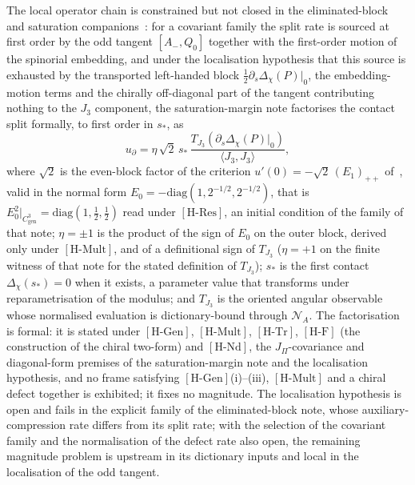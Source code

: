 \documentclass[11pt,a4paper]{article}
\theoremstyle{definition}
\newcommand{\Cgen}{C^3_{\mathrm{gen}}}
\newcommand{\HRes}{\ensuremath{[\mathrm{H\text{-}Res}]}}
\newcommand{\HGen}{\ensuremath{[\mathrm{H\text{-}Gen}]}}
\newcommand{\HMult}{\ensuremath{[\mathrm{H\text{-}Mult}]}}
\newcommand{\HTr}{\ensuremath{[\mathrm{H\text{-}Tr}]}}
\newcommand{\HNd}{\ensuremath{[\mathrm{H\text{-}Nd}]}}
\newcommand{\HF}{\ensuremath{[\mathrm{H\text{-}F}]}}
\begin{document}
    The local operator chain is constrained but not closed in the eliminated-block and saturation
    companions~\cite{Beau2026ebj, Beau2026bim}: for a covariant family the split rate is sourced at first order by the
    odd tangent $[A_-,Q_0]$ together with the first-order motion of the spinorial embedding, and under the localisation
    hypothesis that this source is exhausted by the transported left-handed block $\tfrac12\partial_s\Delta_\chi(P)|_0$,
    the embedding-motion terms and the chirally off-diagonal part of the tangent contributing nothing to the $J_3$
    component, the saturation-margin note factorises the contact split formally, to first order in $s_*$, as
    \[
      u_\partial = \eta\,\sqrt{2}\,s_*\,\frac{T_{J_3}(\partial_s\Delta_\chi(P)|_0)}{\langle J_3, J_3\rangle},
    \]
    where $\sqrt{2}$ is the even-block factor of the criterion $u'(0)=-\sqrt2\,(E_1)_{++}$ of~\cite{Beau2026ebj}, valid in
    the normal form $E_0=-\mathrm{diag}(1,2^{-1/2},2^{-1/2})$, that is
    $E_0^2|_{\Cgen}=\mathrm{diag}(1,\tfrac12,\tfrac12)$ read under \HRes{}, an initial condition of the family of that
    note;
    $\eta=\pm1$ is the product of the sign of $E_0$ on the outer block, derived only under \HMult{}, and of a
    definitional sign of $T_{J_3}$ ($\eta=+1$ on the finite witness of that note for the stated definition of
    $T_{J_3}$);
    $s_*$ is the first contact $\Delta_\chi(s_*)=0$ when it exists, a parameter value that transforms under
    reparametrisation of the modulus; and $T_{J_3}$ is the oriented angular observable whose normalised evaluation is
    dictionary-bound through $\mathcal{N}_A$.
    The factorisation is formal: it is stated under \HGen{}, \HMult{}, \HTr{}, \HF{} (the construction of the chiral two-form) and \HNd{}, the
    $J_\Pi$-covariance and diagonal-form premises of the saturation-margin note and the localisation hypothesis, and no
    frame satisfying \HGen{}(i)--(iii), \HMult{} and a chiral defect together is exhibited; it fixes no magnitude.
    The localisation hypothesis is open and fails in the explicit family of the eliminated-block note, whose
    auxiliary-compression rate differs from its split rate; with the selection of the covariant family and the
    normalisation of the defect rate also open, the remaining magnitude problem is upstream in its dictionary
    inputs and local in the localisation of the odd tangent.
\end{document}
